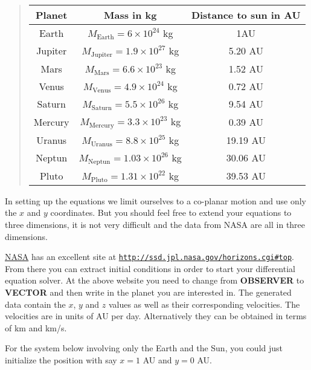\documentclass[%
oneside,                 %
final,                   %
10pt]{article}
\begin{document}
\begin{quote}
\begin{tabular}{ccc}
\hline
\multicolumn{1}{c}{ Planet } & \multicolumn{1}{c}{ Mass in kg } & \multicolumn{1}{c}{ Distance to  sun in AU } \\
\hline
Earth   & $M_{\mathrm{Earth}}=6\times 10^{24}$ kg     & 1AU                    \\
Jupiter & $M_{\mathrm{Jupiter}}=1.9\times 10^{27}$ kg & 5.20 AU                \\
Mars    & $M_{\mathrm{Mars}}=6.6\times 10^{23}$ kg    & 1.52 AU                \\
Venus   & $M_{\mathrm{Venus}}=4.9\times 10^{24}$ kg   & 0.72 AU                \\
Saturn  & $M_{\mathrm{Saturn}}=5.5\times 10^{26}$ kg  & 9.54 AU                \\
Mercury & $M_{\mathrm{Mercury}}=3.3\times 10^{23}$ kg & 0.39 AU                \\
Uranus  & $M_{\mathrm{Uranus}}=8.8\times 10^{25}$ kg  & 19.19 AU               \\
Neptun  & $M_{\mathrm{Neptun}}=1.03\times 10^{26}$ kg & 30.06 AU               \\
Pluto   & $M_{\mathrm{Pluto}}=1.31\times 10^{22}$ kg  & 39.53 AU               \\
\hline
\end{tabular}
\end{quote}

\noindent

In setting up the equations we limit ourselves to a co-planar
motion and use only the $x$ and $y$ coordinates. But you should feel
free to extend your equations to three dimensions, it is not very
difficult and the data from NASA are all in three dimensions.

\href{{http://www.nasa.gov/index.html}}{NASA} has an excellent site at \href{{http://ssd.jpl.nasa.gov/horizons.cgi#top}}{\nolinkurl{http://ssd.jpl.nasa.gov/horizons.cgi\#top}}.
From there you can extract initial conditions in order to start your differential equation solver.
At the above website you need to change from \textbf{OBSERVER} to \textbf{VECTOR} and then write in the planet you are interested in.
The generated data contain the $x$, $y$ and $z$ values as well as their corresponding velocities. The velocities are in units of AU per day.
Alternatively they can be obtained in terms of km and km/s. 

For the system below involving only the Earth and the Sun, you
could just initialize the position with say $x=1$ AU and $y=0$ AU.
\end{document}
